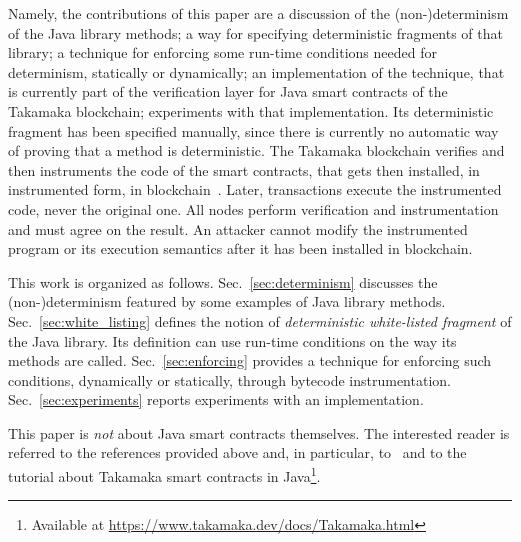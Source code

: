 Namely, the contributions of this paper are a discussion of the (non-)determi\-nism
of the Java library methods; a way for specifying deterministic fragments
of that library; a technique for
enforcing some run-time conditions needed for determinism, statically or dynamically;
an implementation of the technique, that is currently part of the verification
layer for Java smart contracts of the Takamaka blockchain;
experiments with that implementation.
Its deterministic fragment has been specified manually, since there is
currently no automatic way of proving that a method is deterministic.
The Takamaka blockchain verifies and then instruments the code of the smart contracts, that gets
then installed, in instrumented form, in blockchain~\cite{Spoto19}. Later, transactions execute the
instrumented code, never the original one. All nodes perform verification and instrumentation
and must agree on the result. An attacker cannot modify the instrumented program
or its execution semantics after it has been installed in blockchain.

This work is organized as follows.
Sec.~\ref{sec:determinism} discusses the (non-)determinism featured by some
examples of Java library methods.
Sec.~\ref{sec:white_listing} defines the notion of \emph{deterministic white-listed fragment} of the Java library.
Its definition can use run-time conditions on the way its methods are called.
Sec.~\ref{sec:enforcing} provides a technique for enforcing such conditions, dynamically
or statically, through bytecode instrumentation.
Sec.~\ref{sec:experiments} reports experiments with an implementation.

This paper is \emph{not} about Java smart contracts themselves. The interested reader
is referred to the references provided above and, in particular, to~\cite{Spoto19}
and to the tutorial about Takamaka smart contracts in
Java\footnote{Available at \url{https://www.takamaka.dev/docs/Takamaka.html}}.
